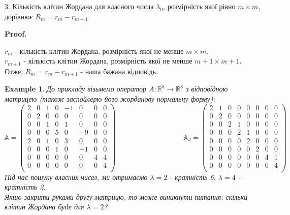 \documentclass[a4paper, 10pt]{article}
\makeatletter
\def\qed{$\blacksquare$}
\theoremstyle{theoremdd}
\theoremstyle{theoremdd}
\theoremstyle{theoremdd}
\theoremstyle{theoremdd}
\newtheorem{example}[theorem]{Example}
\theoremstyle{theoremdd}
\theoremstyle{theoremdd}
\theoremstyle{theoremdd}
\theoremstyle{theoremdd}
\renewenvironment{proof}[1][Proof.\\]{\par
\pushQED{\hfill \qed}%
\normalfont \topsep6\p@\@plus6\p@\relax
\trivlist
\item\relax
{\bfseries
#1\@addpunct{.}}\hspace\labelsep\ignorespaces
}{%
\popQED\endtrivlist\@endpefalse
}
\makeatother
\begin{document}
3. Кількість клітин Жордана для власного числа $\lambda_0$, розмірність якої рівно $m \times m$, дорівнює $R_m = r_m - r_{m+1}$.

\begin{proof}
$r_m$ - кількість клітин Жордана, розмірність якої не менше $m \times m$.\\
$r_{m+1}$ - кількість клітин Жордана, розмірність якої не менше $m+1 \times m+1$.\\
Отже, $R_m = r_m - r_{m+1}$ - наша бажана відповідь.
\end{proof}

\begin{example}
До прикладу візьмемо оператор $A: \mathbb{R}^8 \to \mathbb{R}^8$ з відповідною матрицею (також заспойлерю його жорданову нормальну форму):\\
$\mathbb{A} = \begin{pmatrix}
2 & 0 & 1 & 0 & -1 & 0 & 0 & 0 \\
0 & 2 & 0 & 0 & 0 & 0 & 0 & 0 \\
0 & 0 & 1 & 0 & 1 & 0 & 0 & 0 \\
0 & 0 & 0 & 5 & 0 & -9 & 0 & 0 \\
2 & 0 & 1 & 0 & 3 & 0 & 0 & 0 \\
0 & 0 & 0 & 1 & 0 & -1 & 0 & 0 \\
0 & 0 & 0 & 0 & 0 & 0 & 4 & 4 \\
0 & 0 & 0 & 0 & 0 & 0 & 0 & 4 \\
\end{pmatrix} \hspace{4cm} \mathbb{A}_J = \begin{pmatrix}
2 & 1 & 0 & 0 & 0 & 0 & 0 & 0 \\
0 & 2 & 0 & 0 & 0 & 0 & 0 & 0 \\
0 & 0 & 2 & 1 & 0 & 0 & 0 & 0 \\
0 & 0 & 0 & 2 & 1 & 0 & 0 & 0 \\
0 & 0 & 0 & 0 & 2 & 0 & 0 & 0 \\
0 & 0 & 0 & 0 & 0 & 2 & 0 & 0 \\
0 & 0 & 0 & 0 & 0 & 0 & 4 & 1 \\
0 & 0 & 0 & 0 & 0 & 0 & 0 & 4 \\
\end{pmatrix}$\\
Під час пошуку власних чисел, ми отримаємо $\lambda = 2$ - кратність 6, $\lambda = 4$ - кратність 2.\\
Якщо закрити руками другу матрицю, то може виникнути питання: скільки клітин Жордана буде для $\lambda = 2$?\\

\end{example}
\end{document}

